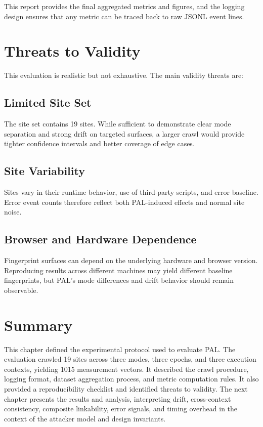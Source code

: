 \documentclass[11pt]{report}
\begin{document}
This report provides the final aggregated metrics and figures, and the logging design ensures that any metric can be traced back to raw JSONL event lines.

\section{Threats to Validity}

This evaluation is realistic but not exhaustive. The main validity threats are:

\subsection{Limited Site Set}

The site set contains 19 sites. While sufficient to demonstrate clear mode separation and strong drift on targeted surfaces, a larger crawl would provide tighter confidence intervals and better coverage of edge cases.

\subsection{Site Variability}

Sites vary in their runtime behavior, use of third-party scripts, and error baseline. Error event counts therefore reflect both PAL-induced effects and normal site noise.

\subsection{Browser and Hardware Dependence}

Fingerprint surfaces can depend on the underlying hardware and browser version. Reproducing results across different machines may yield different baseline fingerprints, but PAL’s mode differences and drift behavior should remain observable.

\section{Summary}

This chapter defined the experimental protocol used to evaluate PAL. The evaluation crawled 19 sites across three modes, three epochs, and three execution contexts, yielding 1015 measurement vectors. It described the crawl procedure, logging format, dataset aggregation process, and metric computation rules. It also provided a reproducibility checklist and identified threats to validity. The next chapter presents the results and analysis, interpreting drift, cross-context consistency, composite linkability, error signals, and timing overhead in the context of the attacker model and design invariants.
\end{document}
